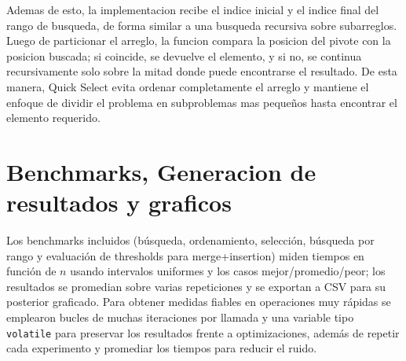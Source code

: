 Ademas de esto, la implementacion recibe el indice inicial y el indice final del rango de busqueda, de forma similar a una busqueda recursiva sobre subarreglos.  
Luego de particionar el arreglo, la funcion compara la posicion del pivote con la posicion buscada; si coincide, se devuelve el elemento, y si no, se continua 
recursivamente solo sobre la mitad donde puede encontrarse el resultado.  De esta manera, Quick Select evita ordenar completamente el arreglo y mantiene el enfoque 
de dividir el problema en subproblemas mas pequeños hasta encontrar el elemento requerido.

\newpage
\section{Benchmarks, Generacion de resultados y graficos}
Los benchmarks incluidos (búsqueda, ordenamiento, selección, búsqueda por rango y evaluación de thresholds para merge+insertion) miden tiempos en función de $n$ usando intervalos uniformes y los casos mejor/promedio/peor; los resultados se promedian sobre varias repeticiones y se exportan a CSV para su posterior graficado. Para obtener medidas fiables en operaciones muy rápidas se emplearon bucles de muchas iteraciones por llamada y una variable tipo \texttt{volatile} para preservar los resultados frente a optimizaciones, además de repetir cada experimento y promediar los tiempos para reducir el ruido.

